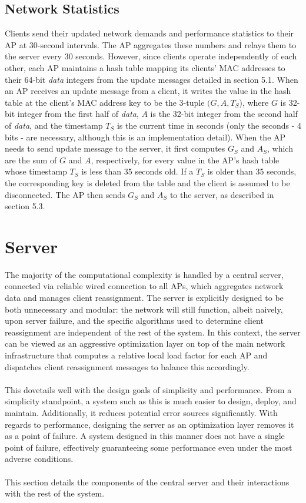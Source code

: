 \documentclass[10pt,journal,compsoc]{IEEEtran}
\begin{document}
		\subsection{Network Statistics}
		Clients send their updated network demands and performance statistics to their AP at 30-second intervals. The AP aggregates these numbers and relays them to the server every 30 seconds. However, since clients operate independently of each other, each AP maintains a hash table mapping its clients' MAC addresses to their 64-bit \textit{data} integers from the update messages detailed in section 5.1. When an AP receives an update message from a client, it writes the value in the hash table at the client's MAC address key to be the 3-tuple \((G, A, T_S\)), where \(G\) is 32-bit integer from the first half of \textit{data}, \(A\) is the 32-bit integer from the second half of \textit{data}, and the timestamp \(T_S\) is the current time in seconds (only the seconds - 4 bits - are necessary, although this is an implementation detail). When the AP needs to send  update message to the server, it first computes \(G_S\) and \(A_S\), which are the sum of \(G\) and \(A\), respectively, for every value in the AP's hash table whose timestamp \(T_S\) is less than 35 seconds old. If a \(T_S\) is older than 35 seconds, the corresponding key is deleted from the table and the client is assumed to be disconnected. The AP then sends \(G_S\) and \(A_S\) to the server, as described in section 5.3.
		
		\section{Server}
		The majority of the computational complexity is handled by a central server, connected via reliable wired connection to all APs, which aggregates network data and manages client reassignment. The server is explicitly designed to be both unnecessary and modular: the network will still function, albeit naively, upon server failure, and the specific algorithms used to determine client reassignment are independent of the rest of the system. In this context, the server can be viewed as an aggressive optimization layer on top of the main network infrastructure that computes a relative local load factor for each AP and dispatches client reassignment messages to balance this accordingly. \\
		\\
		This dovetails well with the design goals of simplicity and performance. From a simplicity standpoint, a system such as this is much easier to design, deploy, and maintain. Additionally, it reduces potential error sources significantly. With regards to performance, designing the server as an optimization layer removes it as a point of failure. A system designed in this manner does not have a single point of failure, effectively guaranteeing some performance even under the most adverse conditions.\\
		\\
		This section details the components of the central server and their interactions with the rest of the system.
		
\end{document}
